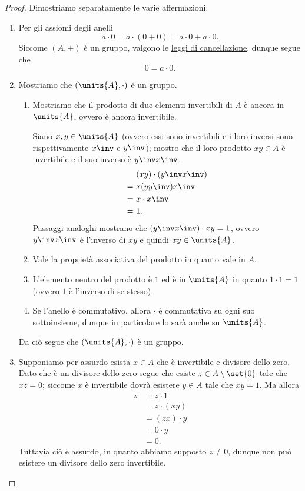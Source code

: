 \begin{proof}
    Dimostriamo separatamente le varie affermazioni.
    \begin{enumerate}[label={(\roman*)}]
        \item Per gli assiomi degli anelli \[
            a \cdot 0 = a \cdot (0 + 0) = a \cdot 0 + a \cdot 0.
        \]        
        Siccome $(A, +)$ è un gruppo, valgono le \hyperref[prop:prop_grp:canc]{leggi di cancellazione}, dunque segue che \[
            0 = a \cdot 0.    
        \]
        \item Mostriamo che $(\units{A}, \cdot)$ è un gruppo.
        \begin{enumerate}[label={(G\arabic*)}]
            \item Mostriamo che il prodotto di due elementi invertibili di $A$ è ancora in $\units{A}$, ovvero è ancora invertibile.
            
            Siano $x,y \in \units{A}$ (ovvero essi sono invertibili e i loro inversi sono rispettivamente $x\inv$ e $y\inv$); mostro che il loro prodotto $xy \in A$ è invertibile e il suo inverso è $y\inv x\inv$.
            \begin{align*}
                &(xy) \cdot (y\inv x\inv) \\
                =\ &x (y y\inv) x\inv  \\
                =\ &x \cdot x\inv \\
                =\ &1.
            \end{align*}
            Passaggi analoghi mostrano che $(y\inv x\inv) \cdot xy = 1$, ovvero $y\inv x\inv$ è l'inverso di $xy$ e quindi $xy \in \units{A}$.
            \item Vale la proprietà associativa del prodotto in quanto vale in $A$.
            \item L'elemento neutro del prodotto è $1$ ed è in $\units{A}$ in quanto $1 \cdot 1 = 1$ (ovvero $1$ è l'inverso di se stesso).
            \item Se l'anello è commutativo, allora $\cdot$ è commutativa su ogni suo sottoinsieme, dunque in particolare lo sarà anche su $\units{A}$.
        \end{enumerate}
        Da ciò segue che $(\units{A}, \cdot)$ è un gruppo.
        \item Supponiamo per assurdo esista $x \in A$ che è invertibile e divisore dello zero.
        Dato che è un divisore dello zero segue che esiste $z \in A \setminus \set{0}$ tale che $xz = 0$; siccome $x$ è invertibile dovrà esistere $y \in A$ tale che $xy = 1$. 
        Ma allora \begin{align*}
            z &= z\cdot 1\\
            &= z \cdot (xy)\\
            &= (zx) \cdot y \\
            &= 0 \cdot y\\
            &= 0.
        \end{align*} Tuttavia ciò è assurdo, in quanto abbiamo supposto $z \neq 0$, dunque non può esistere un divisore dello zero invertibile. \qedhere
    \end{enumerate}
\end{proof}

